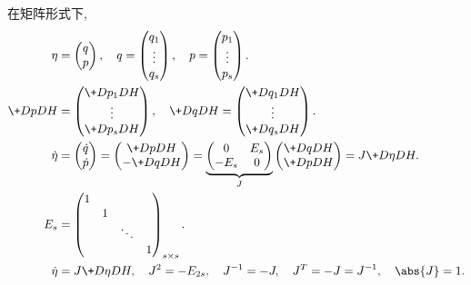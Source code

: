 \documentclass{ctexart}
\begin{document}
在矩阵形式下,
\begin{align*}
    \eta &= \begin{pmatrix}
        q \\ p
    \end{pmatrix},\quad q = \begin{pmatrix}
        q_1 \\ \vdots \\ q_s
    \end{pmatrix},\quad p = \begin{pmatrix}
        p_1 \\ \vdots \\ p_s
    \end{pmatrix}. \\
    \+DpDH &= \begin{pmatrix}
        \+D{p_1}DH \\ \vdots \\ \+D{p_s}DH
    \end{pmatrix},\quad \+DqDH = \begin{pmatrix}
        \+D{q_1}DH \\ \vdots \\ \+D{q_s}DH
    \end{pmatrix}. \\
    \dot{\eta} &= \begin{pmatrix}
        \dot{q} \\ \dot{p}
    \end{pmatrix} = \begin{pmatrix}
        \+DpDH \\ -\+DqDH
    \end{pmatrix} = \underbrace{\begin{pmatrix}
        0 & E_s \\
        -E_s & 0
    \end{pmatrix}}_{J} \begin{pmatrix}
        \+DqDH \\ \+DpDH
    \end{pmatrix} = J\+D\eta DH. \\
    E_s &= \begin{pmatrix}
        1 & & & \\
        & 1 & & \\
        & & \ddots & \\
        & & & 1
    \end{pmatrix}_{s\times s}. \\
    \dot{\eta} &= J\+D\eta DH,\quad J^2 = -E_{2s},\quad J^{-1} = -J,\quad J^T = -J = J^{-1}, \quad \abs{J} = 1.
\end{align*}
\end{document}
